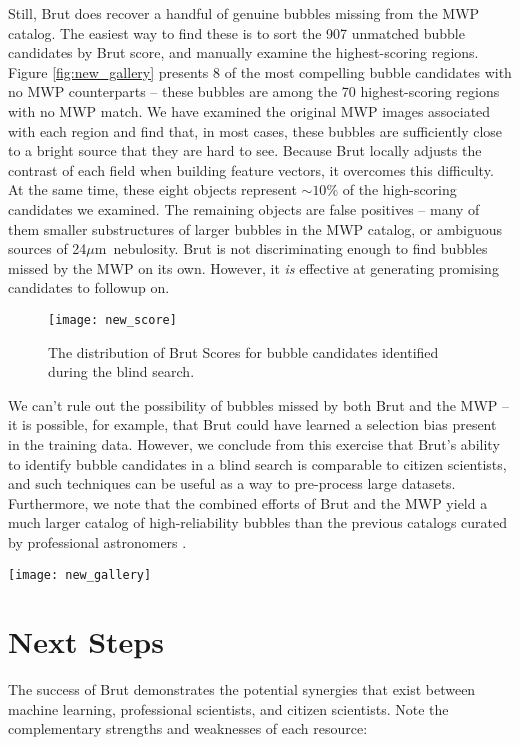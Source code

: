 \documentclass[preprint]{aastex}
\newcommand{\um}[0]{$\mu$m}
\begin{document}
Still, Brut does recover a handful of genuine bubbles missing from the MWP catalog. The easiest way to find these is to sort the 907 unmatched bubble candidates by Brut score, and manually examine the highest-scoring regions. Figure \ref{fig:new_gallery} presents 8 of the most compelling bubble candidates with no MWP counterparts -- these bubbles are among the 70 highest-scoring regions with no MWP match. We have examined the original MWP images associated with each region and find that, in most cases, these bubbles are sufficiently close to a bright source that they are hard to see. Because Brut locally adjusts the contrast of each field when building feature vectors, it overcomes this difficulty. At the same time, these eight objects represent $\sim 10\%$ of the high-scoring candidates we examined. The remaining objects are false positives -- many of them smaller substructures of larger bubbles in the MWP catalog, or ambiguous sources of 24\um\, nebulosity. Brut is not discriminating enough to find bubbles missed by the MWP on its own. However, it \textit{is} effective at generating promising candidates to followup on.

\begin{figure}[h!]
\texttt{[image: new\_score]}
\caption{The distribution of Brut Scores for bubble candidates identified during the blind search.}
\label{fig:new_score}
\end{figure}

We can't rule out the possibility of bubbles missed by both Brut and the MWP -- it is possible, for example, that Brut could have learned a selection bias present in the training data. However, we conclude from this exercise that Brut's ability to identify bubble candidates in a blind search is comparable to citizen scientists, and such techniques can be useful as a way to pre-process large datasets. Furthermore, we note that the combined efforts of Brut and the MWP yield a much larger catalog of high-reliability bubbles than the previous catalogs curated by professional astronomers \citep{Churchwell06, Churchwell07}. 

\begin{figure*}
\texttt{[image: new\_gallery]}
\caption{Eight bubbles not present in the Milky Way Project catalog, discovered by Brut during a blind search.}
\label{fig:new_gallery}
\end{figure*}

\section{Next Steps}
\label{sec:next_steps}
The success of Brut demonstrates the potential synergies that exist between machine learning, professional scientists, and citizen scientists. Note the complementary strengths and weaknesses of each resource:
\end{document}
